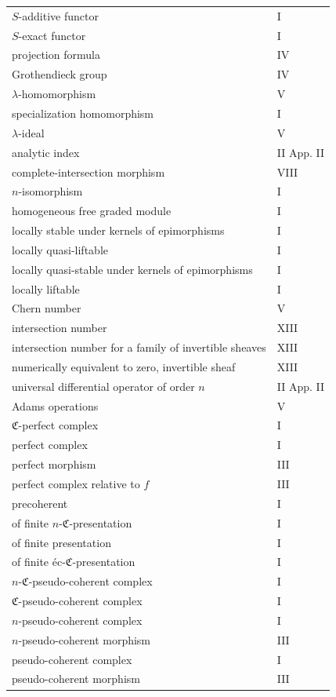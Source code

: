 \documentclass[11pt]{article}
\theoremstyle{plain}
\theoremstyle{definition}
\theoremstyle{remark}
\begin{document}
\begin{longtable}{p{8.5cm}l}
$S$-additive functor & I\\
$S$-exact functor & I\\
projection formula & IV\\
Grothendieck group & IV\\
$\lambda$-homomorphism & V\\
specialization homomorphism & I\\
$\lambda$-ideal & V\\
analytic index & II App. II\\
complete-intersection morphism & VIII\\
$n$-isomorphism & I\\
homogeneous free graded module & I\\
locally stable under kernels of epimorphisms & I\\
locally quasi-liftable & I\\
locally quasi-stable under kernels of epimorphisms & I\\
locally liftable & I\\
Chern number & V\\
intersection number & XIII\\
intersection number for a family of invertible sheaves & XIII\\
numerically equivalent to zero, invertible sheaf & XIII\\
universal differential operator of order $n$ & II App. II\\
Adams operations & V\\
$\mathfrak C$-perfect complex & I\\
perfect complex & I\\
perfect morphism & III\\
perfect complex relative to $f$ & III\\
precoherent & I\\
of finite $n$-$\mathfrak C$-presentation & I\\
of finite presentation & I\\
of finite éc-$\mathfrak C$-presentation & I\\
$n$-$\mathfrak C$-pseudo-coherent complex & I\\
$\mathfrak C$-pseudo-coherent complex & I\\
$n$-pseudo-coherent complex & I\\
$n$-pseudo-coherent morphism & III\\
pseudo-coherent complex & I\\
pseudo-coherent morphism & III\\

\end{longtable}
\end{document}
